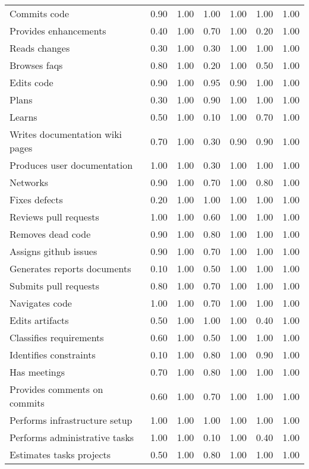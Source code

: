 \begin{tabular}{lrrrrrr}
Commits code & 0.90 & 1.00 & 1.00 & 1.00 & 1.00 & 1.00 \\
Provides enhancements & 0.40 & 1.00 & 0.70 & 1.00 & 0.20 & 1.00 \\
Reads changes & 0.30 & 1.00 & 0.30 & 1.00 & 1.00 & 1.00 \\
Browses faqs & 0.80 & 1.00 & 0.20 & 1.00 & 0.50 & 1.00 \\
Edits code & 0.90 & 1.00 & 0.95 & 0.90 & 1.00 & 1.00 \\
Plans & 0.30 & 1.00 & 0.90 & 1.00 & 1.00 & 1.00 \\
Learns & 0.50 & 1.00 & 0.10 & 1.00 & 0.70 & 1.00 \\
Writes documentation wiki pages & 0.70 & 1.00 & 0.30 & 0.90 & 0.90 & 1.00 \\
Produces user documentation & 1.00 & 1.00 & 0.30 & 1.00 & 1.00 & 1.00 \\
Networks & 0.90 & 1.00 & 0.70 & 1.00 & 0.80 & 1.00 \\
Fixes defects & 0.20 & 1.00 & 1.00 & 1.00 & 1.00 & 1.00 \\
Reviews pull requests & 1.00 & 1.00 & 0.60 & 1.00 & 1.00 & 1.00 \\
Removes dead code & 0.90 & 1.00 & 0.80 & 1.00 & 1.00 & 1.00 \\
Assigns github issues & 0.90 & 1.00 & 0.70 & 1.00 & 1.00 & 1.00 \\
Generates reports documents & 0.10 & 1.00 & 0.50 & 1.00 & 1.00 & 1.00 \\
Submits pull requests & 0.80 & 1.00 & 0.70 & 1.00 & 1.00 & 1.00 \\
Navigates code & 1.00 & 1.00 & 0.70 & 1.00 & 1.00 & 1.00 \\
Edits artifacts & 0.50 & 1.00 & 1.00 & 1.00 & 0.40 & 1.00 \\
Classifies requirements & 0.60 & 1.00 & 0.50 & 1.00 & 1.00 & 1.00 \\
Identifies constraints & 0.10 & 1.00 & 0.80 & 1.00 & 0.90 & 1.00 \\
Has meetings & 0.70 & 1.00 & 0.80 & 1.00 & 1.00 & 1.00 \\
Provides comments on commits & 0.60 & 1.00 & 0.70 & 1.00 & 1.00 & 1.00 \\
Performs infrastructure setup & 1.00 & 1.00 & 1.00 & 1.00 & 1.00 & 1.00 \\
Performs administrative tasks & 1.00 & 1.00 & 0.10 & 1.00 & 0.40 & 1.00 \\
Estimates tasks projects & 0.50 & 1.00 & 0.80 & 1.00 & 1.00 & 1.00 \\

\end{tabular}
